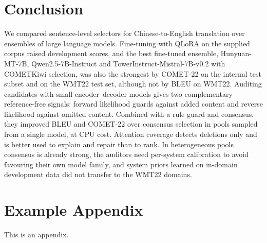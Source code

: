 \documentclass[11pt]{article}
\begin{document}
\section{Conclusion}
\label{sec:conclusion}
We compared sentence-level selectors for Chinese-to-English translation over ensembles of large language models. Fine-tuning with QLoRA on the supplied corpus raised development scores, and the best fine-tuned ensemble, Hunyuan-MT-7B, Qwen2.5-7B-Instruct and TowerInstruct-Mistral-7B-v0.2 with COMETKiwi selection, was also the strongest by COMET-22 on the internal test subset and on the WMT22 test set, although not by BLEU on WMT22. Auditing candidates with small encoder--decoder models gives two complementary reference-free signals: forward likelihood guards against added content and reverse likelihood against omitted content. Combined with a rule guard and consensus, they improved BLEU and COMET-22 over consensus selection in pools sampled from a single model, at CPU cost. Attention coverage detects deletions only and is better used to explain and repair than to rank. In heterogeneous pools consensus is already strong, the auditors need per-system calibration to avoid favouring their own model family, and system priors learned on in-domain development data did not transfer to the WMT22 domains.


\appendix

\section{Example Appendix}
\label{sec:appendix}

This is an appendix.
\end{document}
